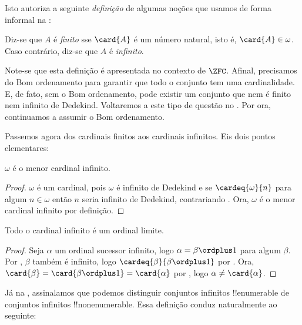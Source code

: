 \documentclass[../../../include/open-logic-section]{subfiles}
\begin{document}
Isto autoriza a seguinte \emph{definição} de algumas noções que usamos
de forma informal na :

\begin{defn}
Diz-se que $A$ é \emph{finito} sse $\card{A}$ é um número natural,
isto é, $\card{A} \in \omega$. Caso contrário, diz-se que $A$ é
\emph{infinito}.
\end{defn}
\noindent
Note-se que esta definição é apresentada no contexto de
$\ZFC$. Afinal, precisamos do Bom ordenamento para garantir que todo o conjunto
tem uma cardinalidade. E, de fato, sem o Bom ordenamento, pode existir um
conjunto que nem é finito nem infinito de Dedekind. Voltaremos a
este tipo de questão no . Por ora, continuamos a
assumir o Bom ordenamento.

Passemos agora dos cardinais finitos aos cardinais infinitos.
Eis dois pontos elementares:

\begin{cor}
$\omega$ é o menor cardinal infinito.
\end{cor}

\begin{proof}
$\omega$ é um cardinal, pois $\omega$ é infinito de Dedekind e se
$\cardeq{\omega}{n}$ para algum $n \in \omega$ então $n$ seria infinito de Dedekind,
contrariando
. Ora,
$\omega$ é o menor cardinal infinito por definição.
\end{proof}

\begin{cor}
Todo o cardinal infinito é um ordinal limite.
\end{cor}

\begin{proof}
Seja $\alpha$ um ordinal sucessor infinito, logo $\alpha = \beta
\ordplus 1$ para algum $\beta$. Por , $\beta$
também é infinito, logo $\cardeq{\beta}{\beta \ordplus 1}$ por
. Ora,
$\card{\beta} = \card{\beta\ordplus 1} = \card{\alpha}$ por
, logo
$\alpha \neq \card{\alpha}$.
\end{proof}

Já na , assinalamos que
podemos distinguir conjuntos infinitos !!{enumerable} de conjuntos infinitos
!!{nonenumerable}. Essa definição conduz naturalmente ao seguinte:
\end{document}
